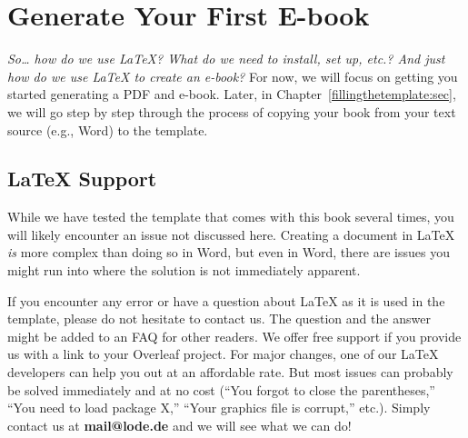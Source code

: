

\section{Generate Your First E-book}\label{generateyourfirstebook:sec}

\textit{So\dots{} how do we use LaTeX? What do we need to install, set up, etc.? And just how do we use LaTeX to create an e-book?} For now, we will focus on getting you started generating a PDF and e-book. Later, in Chapter~\ref{fillingthetemplate:sec}, we will go step by step through the process of copying your book from your text source (e.g., Word) to the template.


\subsection{LaTeX Support}\label{latexhelp:sec}

While we have tested the template that comes with this book several times, you will likely encounter an issue not discussed here. Creating a document in LaTeX \textit{is} more complex than doing so in Word, but even in Word, there are issues you might run into where the solution is not immediately apparent. 

If you encounter any error or have a question about LaTeX as it is used in the template, please do not hesitate to contact us. The question and the answer might be added to an FAQ for other readers. We offer free support if you provide us with a link to your Overleaf project. For major changes, one of our LaTeX developers can help you out at an affordable rate. But most issues can probably be solved immediately and at no cost (``You forgot to close the parentheses,'' ``You need to load package X,'' ``Your graphics file is corrupt,'' etc.). Simply contact us at \textbf{mail@lode.de} and we will see what we can do!

